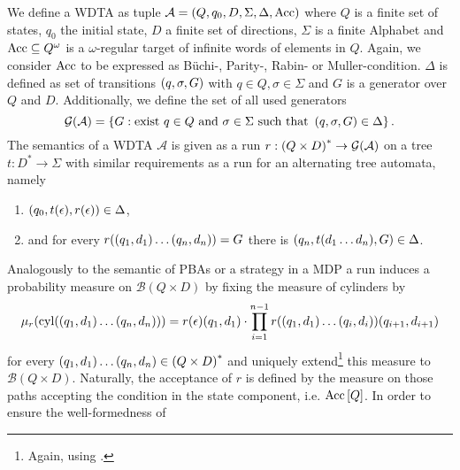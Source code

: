\begin{definition}
  We define a \acl{WDTA} as tuple
  $\mathcal{A} = \left(Q, q_{0}, D, \Sigma, \Delta, \operatorname{Acc}\right)$ where $Q$ is a 
  finite set of states, $q_{0}$ the initial state, $D$ a finite set of 
  directions, $\Sigma$ is a finite Alphabet and $\operatorname{Acc}\subseteq Q^{\omega}$ is a
  $\omega$-regular target of infinite words of elements in $Q$. Again, we 
  consider $\operatorname{Acc}$ to be expressed as Büchi-, Parity-, Rabin- or 
  Muller-condition. $\Delta$ is defined as set of transitions 
  $\left(q,\sigma,G\right)$ with $q\in Q, \sigma\in\Sigma$ and $G$ is a generator 
  over $Q$ and $D$. Additionally, we define the set of all used generators 
  \begin{equation*}
    \mathcal{G}(\mathcal{A}) = \left\{
      G:\text{exist }q\in Q\text{ and }\sigma\in\Sigma
      \text{ such that }\left(q,\sigma,G\right)\in\Delta
    \right\}.
  \end{equation*}
  The semantics of a \ac{WDTA} $\mathcal{A}$ is given as a run
  $r:\left(Q\times D\right)^{*}\rightarrow \mathcal{G}(\mathcal{A})$ on a tree 
  $t:D^{*}\rightarrow\Sigma$ with similar requirements as a run for an 
  alternating tree automata, namely
  \begin{enumerate}
    \item $\left(q_{0}, t(\epsilon), r(\epsilon)\right)\in\Delta$,
    \item and for every $r(\left(q_{1}, d_{1}\right)\dots\left(q_{n}, d_{n}\right)) = G$ 
      there is $\left(q_{n}, t(d_{1}\dots d_{n}), G\right)\in\Delta$.
  \end{enumerate}
\end{definition}
Analogously to the semantic of \acp{PBA} or a strategy in a \ac{MDP} a run 
induces a probability measure on $\mathcal{B}(Q\times D)$ by fixing the measure
of cylinders by 
\begin{equation*}
  \mu_{r}(\operatorname{cyl}(\left(q_{1},d_{1}\right)\dots\left(q_{n},d_{n}\right)))
    = r(\epsilon)(q_{1},d_{1})\cdot\prod\limits_{i = 1}^{n - 1}
    r(\left(q_{1},d_{1}\right)\dots\left(q_{i},d_{i}\right))(q_{i+1},d_{i+1})
\end{equation*}
for every $\left(q_{1},d_{1}\right)\dots\left(q_{n},d_{n}\right)\in\left(Q\times D\right)^{*}$
and uniquely extend\footnote{
  Again, using \cite[Theorem 5.6 (Carath\'{e}odory's extension theorem) and 
  Theorem 5.4]{Bauer}.
} this measure to $\mathcal{B}(Q\times D)$. Naturally, the acceptance of $r$ is 
defined by the measure on those paths accepting the condition in the state 
component, i.e. $\operatorname{Acc}\left[Q\right]$. In order to ensure the well-formedness of 
